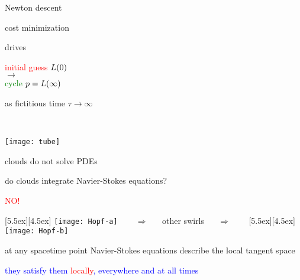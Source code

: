 \begin{frame}{Newton descent}
\bigskip

cost minimization

\bigskip

\begin{center}
\begin{minipage}[c]{0.55\textwidth}
\begin{center}
\bigskip

drives

\bigskip

	\vskip 1.0cm

\textcolor{red}{initial guess $L(0)$}
\\$\to$\\
\textcolor{green}{cycle $p = L(\infty)$}

	\vskip 1.0cm

as fictitious time $\tau \to \infty$
\end{center}
\end{minipage}%
~~~~~~~\begin{minipage}[c]{0.40\textwidth}
	\begin{center}
	\texttt{[image: tube]}
	\end{center}
\end{minipage}
\end{center}
\end{frame}

\begin{frame}{clouds do not solve PDEs}

do clouds integrate Navier-Stokes equations?

\begin{center}
\centerline{\textcolor{red}{\Huge NO!}}

\begin{minipage}[t]{\textwidth}
	\begin{center}
\centerline{
\raisebox{-4.0ex}[5.5ex][4.5ex]
		 {\texttt{[image: Hopf-a]}}
~~~ $\Longrightarrow$ ~~ {other swirls} ~~ $\Longrightarrow$ ~~~
	\raisebox{-4.0ex}[5.5ex][4.5ex]
		 {\texttt{[image: Hopf-b]}}
          }
	\end{center}
\end{minipage}
\end{center}

at any spacetime point Navier-Stokes equations describe the local tangent space

\bigskip

\centerline{
\textcolor{blue}{they satisfy them \textcolor{red}{\large locally}, everywhere and at all times}
}
\end{frame}


